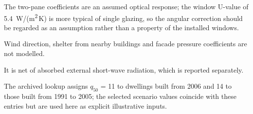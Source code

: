 The two-pane coefficients are an assumed optical response; the window U-value
of 5.4~W/(m\textsuperscript{2}\,K) is more typical of single glazing, so the
angular correction should be regarded as an assumption rather than a property
of the installed windows.



Wind direction, shelter from nearby buildings and facade pressure
coefficients are not modelled.

It is net of absorbed external short-wave radiation, which is reported
separately.

The archived lookup assigns $q_{50}$ = 11 to dwellings built from 2006 and
14 to those built from 1991 to 2005; the selected scenario values coincide
with these entries but are used here as explicit illustrative inputs.



